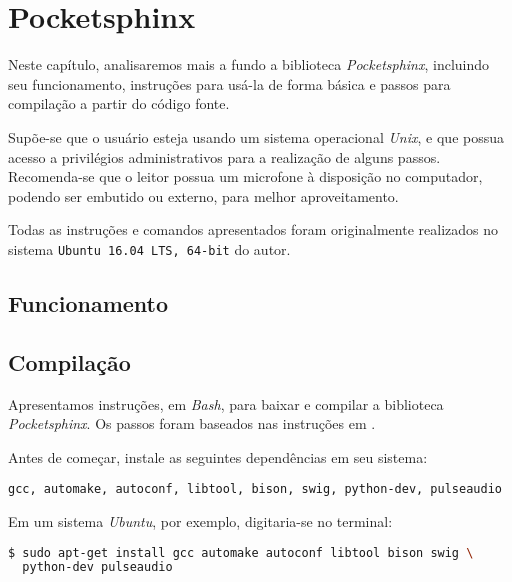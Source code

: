 \chapter{Pocketsphinx}
\label{cap:pocketsphinx}

Neste capítulo, analisaremos mais a fundo a biblioteca \textit{Pocketsphinx}, incluindo seu funcionamento, instruções para usá-la de forma básica e passos para compilação a partir do código fonte.

Supõe-se que o usuário esteja usando um sistema operacional \textit{Unix}, e que possua acesso a privilégios administrativos para a realização de alguns passos. Recomenda-se que o leitor possua um microfone à disposição no computador, podendo ser embutido ou externo, para melhor aproveitamento.

Todas as instruções e comandos apresentados foram originalmente realizados no sistema \texttt{Ubuntu 16.04 LTS, 64-bit} do autor.


\section{Funcionamento}


\section{Compilação}

Apresentamos instruções, em \textit{Bash}, para baixar e compilar a biblioteca \textit{Pocketsphinx}. Os passos foram baseados nas instruções em \citep{pocketsphinxInstall}.

Antes de começar, instale as seguintes dependências em seu sistema:

\begin{center}
\footnotesize\texttt{gcc, automake, autoconf, libtool, bison, swig, python-dev, pulseaudio}
\end{center}

Em um sistema \emph{Ubuntu}, por exemplo, digitaria-se no terminal:

\begin{lstlisting}[language=Bash]
$ sudo apt-get install gcc automake autoconf libtool bison swig \
  python-dev pulseaudio
\end{lstlisting}


